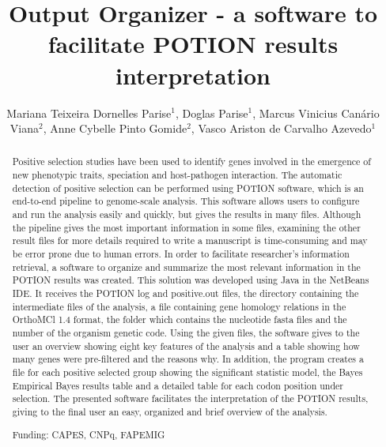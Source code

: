 \documentclass[twoside]{article}
\title{\vspace{-15mm}\fontsize{24pt}{10pt}\selectfont\textbf{Output Organizer - a software to facilitate POTION results interpretation}} %
\author{Mariana Teixeira Dornelles Parise$^1$, Doglas Parise$^1$, Marcus Vinicius Can\'ario Viana$^2$, Anne Cybelle Pinto Gomide$^2$, Vasco Ariston de Carvalho Azevedo$^1$}
\affil{1 UFMG\\ }
\date{}
\begin{document}
\maketitle %

\thispagestyle{fancy} %


\begin{abstract}
Positive selection studies have been used to identify genes involved in the emergence of new phenotypic traits, speciation and host-pathogen interaction. The automatic detection of positive selection can be performed using POTION software, which is an end-to-end pipeline to genome-scale analysis. This software allows users to configure and run the analysis easily and quickly, but gives the results in many files. Although the pipeline gives the most important information in some files, examining the other result files for more details required to write a manuscript is time-consuming and may be error prone due to human errors. In order to facilitate researcher's information retrieval, a software to organize and summarize the most relevant information in the POTION results was created.  This solution was developed using Java in the NetBeans IDE. It receives the POTION log and positive.out files, the directory containing the intermediate files of the analysis, a file containing gene homology relations in the OrthoMCl 1.4 format, the folder which contains the nucleotide fasta files and the number of the organism genetic code. Using the given files, the software gives to the user an overview showing eight key features of the analysis and a table showing how many genes were pre-filtered and the reasons why. In addition, the program creates a file for each positive selected group showing the significant statistic model, the Bayes Empirical Bayes results table and a detailed table for each codon position under selection. The presented software facilitates the interpretation of the POTION results, giving to the final user an easy, organized and brief overview of the analysis.

Funding: CAPES, CNPq, FAPEMIG
\end{abstract}
\end{document}
